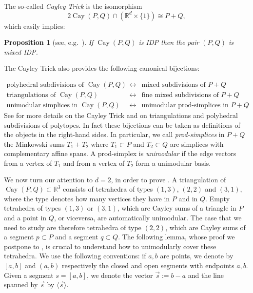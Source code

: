 \documentclass{amsart}
\theoremstyle{plain}
\newtheorem{proposition}[theorem]{Proposition}
\theoremstyle{definition}
\newcommand{\R}{ \ensuremath{\mathbb{R}}}
\renewcommand{\vec}[1]{\overrightarrow#1}
\newcommand{\vecline}[1]{\langle \vec #1 \rangle}
\newcommand{\cayley}{\operatorname{Cay}}
\begin{document}
The so-called \emph{Cayley Trick} is the isomorphism
\[
2\cayley(P, Q) \cap (\R^d\times \{1\}) \cong P+Q,
\]
which easily implies:

\begin{proposition}[see, e.g.~]
\label{prop:mixedIDP}
If $\cayley(P,Q)$ is IDP then the pair $(P,Q)$ is mixed IDP.
\end{proposition}

The Cayley Trick also provides the following canonical bijections:

\[
\begin{array}{ccc}
\text{polyhedral subdivisions of $\cayley(P,Q)$} &\leftrightarrow& \text{mixed subdivisions of $P + Q$}\\
\text{triangulations of $\cayley(P,Q)$} &\leftrightarrow& \text{fine mixed subdivisions of $P + Q$}\\
\text{unimodular simplices in $\cayley(P,Q)$} &\leftrightarrow& \text{unimodular prod-simplices in $P + Q$}.
\end{array}
\]
See \cite{DLRS2010} for more details on the Cayley Trick and on triangulations and polyhedral subdivisions of polytopes.
In fact these bijections can be taken as definitions of the objects in the right-hand sides. In particular, 
we call \emph{prod-simplices} in $P+Q$ the Minkowski sums $T_1+T_2$ where $T_1\subset P$ and $T_2\subset Q$ are simplices with complementary affine spans. A prod-simplex is \emph{unimodular} if the edge vectors from a vertex of $T_1$ and from a vertex of $T_2$ form a unimodular basis.

\medskip

We now turn our attention to $d=2$, in order to prove . A triangulation of $\cayley(P,Q)\subset \R^3$ consists of tetrahedra of types $(1,3)$, $(2,2)$ and $(3,1)$, where the type denotes how many vertices they have in $P$ and in $Q$. Empty tetrahedra of types $(1,3)$ or $(3,1)$, which are Cayley sums of a triangle in $P$ and a point in $Q$, or viceversa, are automatically unimodular. The case that we need to study are therefore tetrahedra of type $(2,2)$, which are Cayley sums of a segment $p\subset P$ and a segment $q\subset Q$.
The following lemma, whose proof we postpone to , is crucial to understand how to unimodularly cover these tetrahedra. 
We use the following conventions: if $a, b$ are points, we denote by $[a,b]$ and $(a,b)$ respectively the closed and open segments with endpoints $a,b$. Given a segment $s=[a,b]$, we denote the vector $\vec s:= b-a$ and  the line spanned by $\vec s$ by $\vecline s$.
\end{document}
